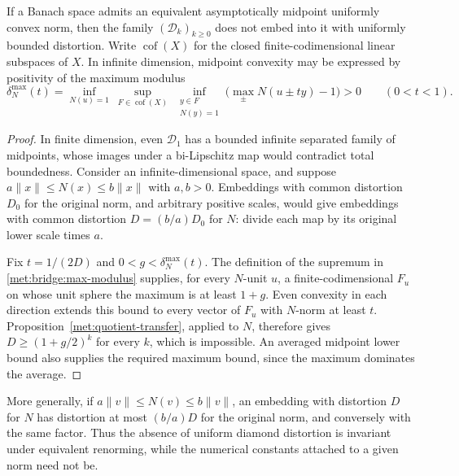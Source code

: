 \begin{theorem}\label{met:bridge:equivalent-amuc}
If a Banach space admits an equivalent asymptotically midpoint
uniformly convex norm, then the family $(\mathcal D_k)_{k\ge0}$
does not embed into it with uniformly bounded distortion.
Write $\operatorname{cof}(X)$ for the closed finite-codimensional
linear subspaces of $X$. In infinite dimension, midpoint convexity may be expressed by
positivity of the maximum modulus
\begin{equation}\label{met:bridge:max-modulus}
 \delta_N^{\max}(t)=
 \inf_{N(u)=1}\ 
 \sup_{F\in\operatorname{cof}(X)}\ 
 \inf_{\substack{y\in F\\N(y)=1}}
 \bigl(\max_\pm N(u\pm t y)-1\bigr)>0
 \qquad(0<t<1).
\end{equation}
\end{theorem}
\begin{proof}
In finite dimension, even $\mathcal D_1$ has a bounded infinite
separated family of midpoints, whose images under a bi-Lipschitz
map would contradict total boundedness. Consider an
infinite-dimensional space, and suppose $a\|x\|\le N(x)\le b\|x\|$
with $a,b>0$. Embeddings with common distortion $D_0$ for the original
norm, and arbitrary positive scales, would give embeddings with common
distortion $D=(b/a)D_0$ for $N$: divide each map by its original
lower scale times $a$.

Fix $t=1/(2D)$ and $0<g<\delta_N^{\max}(t)$. The definition of the
supremum in \eqref{met:bridge:max-modulus} supplies, for every
$N$-unit $u$, a finite-codimensional $F_u$ on whose unit sphere the
maximum is at least $1+g$. Even convexity in each direction extends
this bound to every vector of $F_u$ with $N$-norm at least $t$.
Proposition~\ref{met:quotient-transfer}, applied to $N$, therefore
gives $D\ge(1+g/2)^k$ for every $k$, which is impossible.
An averaged midpoint lower bound also supplies the required maximum
bound, since the maximum dominates the average.
\end{proof}


More generally, if $a\|v\|\le N(v)\le b\|v\|$, an embedding with
distortion $D$ for $N$ has distortion at most $(b/a)D$ for the original
norm, and conversely with the same factor. Thus the absence of uniform
diamond distortion is invariant under equivalent renorming, while the
numerical constants attached to a given norm need not be.
